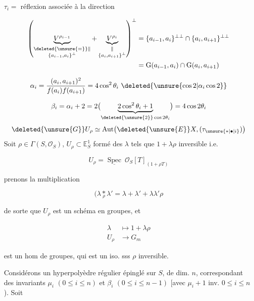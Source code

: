 $\tau_i={}$ réflexion associée à la direction

\[
\begin{aligned}
\left(
\underbrace{V^{\rho_{i-1}}}_{\substack{\deleted{\unsure{=}}\Vert\\\{a_{i-1},a_i\}^{\perp}}}
+\underbrace{V^{\rho_i}}_{\substack{\Vert\\\{a_i,a_{i+1}\}^{\perp}}}
\right)^{\perp}
&=\{a_{i-1},a_i\}^{\perp\perp}\cap\{a_i,a_{i+1}\}^{\perp\perp}\\
&=\mathrm{G}(a_{i-1},a_i)\cap\mathrm{G}(a_i,a_{i+1})
\end{aligned}
\]

\[
\alpha_i=\frac{(a_i,a_{i+1})^2}{f(a_i)f(a_{i+1})}=4\cos^2\theta_i\ \deleted{\unsure{\cos 2|\alpha_i\cos 2}}
\]

\[
\beta_i=\alpha_i+2=2\bigl(\underbrace{2\cos^{2}\theta_i+1}_{\deleted{\unsure{2}}\cos 2\theta_i}\bigr)=4\cos2\theta_i
\]
\[
\deleted{\unsure{G}}U_{\rho}\simeq\operatorname{Aut}\bigl(\deleted{\unsure{E}}X,(\tau_{\unsure{*|\bullet|i}})\bigr)
\]
Soit $\rho\in\Gamma(S,\mathcal O_S)$, $U_\rho\subset\mathbb E^{1}_{S}$ formé des $\lambda$ tels que $1+\lambda\rho$ inversible i.e.

\[
U_\rho=\underline{\operatorname{Spec}}\ \mathcal O_S[T]_{(1+\rho T)}
\]

prenons la multiplication

\[
(\lambda\mathbin{\underset{\rho}{*}}\lambda'=\lambda+\lambda'+\lambda\lambda'\rho
\]

de sorte que $U_\rho$ est un schéma en groupes, et

\[
\begin{aligned}
\lambda&\mapsto 1+\lambda\rho\\
U_\rho&\longrightarrow G_m
\end{aligned}
\]

est un hom de groupes, qui est un iso. sss $\rho$ inversible.

Considérons un hyperpolyèdre régulier  épinglé sur $S$, de dim. $n$, correspondant  des invariants $\mu_i$ $(0\leq i\leq n)$ et $\beta_i$ $(0\leq i\leq n-1)$ [avec $\mu_i+1$ inv. $0\leq i\leq n$). Soit 

